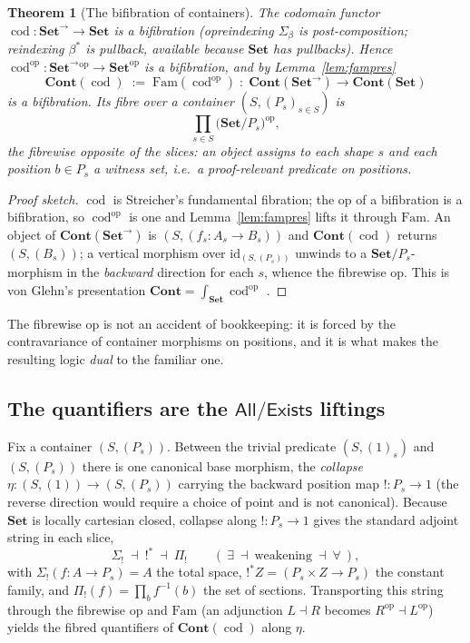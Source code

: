 \documentclass[11pt]{amsart}
\theoremstyle{plain}
\newtheorem{theorem}{Theorem}[section]
\theoremstyle{definition}
\theoremstyle{remark}
\newcommand{\Set}{\mathbf{Set}}
\newcommand{\Fam}{\mathrm{Fam}}
\newcommand{\Cont}{\mathbf{Cont}}
\newcommand{\op}{\mathrm{op}}
\newcommand{\id}{\mathrm{id}}
\newcommand{\prodd}{\textstyle\prod}
\DeclareMathOperator{\cod}{cod}
\newcommand{\Arr}[1]{#1^{\rightarrow}}
\begin{document}
\begin{theorem}[The bifibration of containers]\label{thm:contcod}
The codomain functor $\cod\colon\Arr{\Set}\to\Set$ is a bifibration (opreindexing $\Sigma_\beta$ is
post-composition; reindexing $\beta^*$ is pullback, available because $\Set$ has pullbacks). Hence
$\cod^\op\colon\Arr{\Set}{}^\op\to\Set^\op$ is a bifibration, and by Lemma~\ref{lem:fampres}
\[
\Cont(\cod)\;:=\;\Fam(\cod^\op)\;\colon\;\Cont(\Arr{\Set})\longrightarrow\Cont(\Set)
\]
is a bifibration. Its fibre over a container $(S,(P_s)_{s\in S})$ is
\[
\prodd_{s\in S}\bigl(\Set/P_s\bigr)^{\op},
\]
the \emph{fibrewise opposite} of the slices: an object assigns to each shape $s$ and each position
$b\in P_s$ a witness set, i.e.\ a \emph{proof-relevant predicate on positions}.
\end{theorem}
\begin{proof}[Proof sketch]
$\cod$ is Streicher's fundamental fibration; the op of a bifibration is a bifibration, so
$\cod^\op$ is one and Lemma~\ref{lem:fampres} lifts it through $\Fam$. An object of
$\Cont(\Arr{\Set})$ is $(S,(f_s\colon A_s\to B_s))$ and $\Cont(\cod)$ returns $(S,(B_s))$; a vertical
morphism over $\id_{(S,(P_s))}$ unwinds to a $\Set/P_s$-morphism in the \emph{backward} direction for
each $s$, whence the fibrewise op. This is von Glehn's presentation $\Cont=\int_{\Set}\cod^\op$
\cite{vonGlehn}.
\end{proof}

The fibrewise op is not an accident of bookkeeping: it is forced by the contravariance of container
morphisms on positions, and it is what makes the resulting logic \emph{dual} to the familiar one.

\subsection{The quantifiers are the $\mathsf{All}/\mathsf{Exists}$ liftings}\label{ss:quantifiers}
Fix a container $(S,(P_s))$. Between the trivial predicate $(S,(1)_s)$ and $(S,(P_s))$ there is one
canonical base morphism, the \emph{collapse} $\eta\colon(S,(1))\to(S,(P_s))$ carrying the backward
position map ${!}\colon P_s\to 1$ (the reverse direction would require a choice of point and is not
canonical). Because $\Set$ is locally cartesian closed, collapse along $!\colon P_s\to 1$ gives the
standard adjoint string in each slice,
\[
\Sigma_{!}\ \dashv\ {!}^*\ \dashv\ \Pi_{!}
\qquad(\ \exists\ \dashv\ \text{weakening}\ \dashv\ \forall\ ),
\]
with $\Sigma_{!}(f\colon A\to P_s)=A$ the total space, ${!}^*Z=(P_s\times Z\to P_s)$ the constant
family, and $\Pi_{!}(f)=\prodd_{b}f^{-1}(b)$ the set of sections. Transporting this string through the
fibrewise op and $\Fam$ (an adjunction $L\dashv R$ becomes $R^\op\dashv L^\op$) yields the fibred
quantifiers of $\Cont(\cod)$ along $\eta$.
\end{document}
